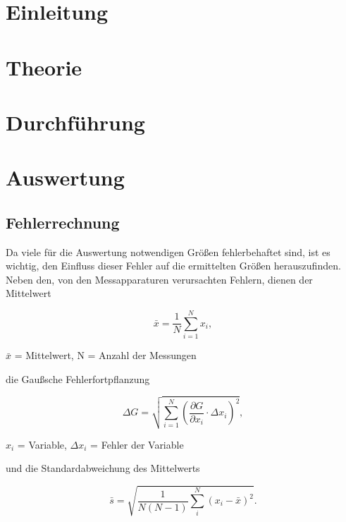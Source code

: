 
\section{Einleitung}				%

\section{Theorie}

\section{Durchführung}

\section{Auswertung}
\subsection{Fehlerrechnung}
Da viele für die Auswertung notwendigen Größen fehlerbehaftet sind, ist es wichtig, den Einfluss dieser Fehler auf die ermittelten
Größen herauszufinden. Neben den, von den Messapparaturen verursachten Fehlern, dienen der Mittelwert
\begin{formel}
\begin{equation}
 \bar{x} = \frac1N \sum_{i=1}^{N} x_i,
 \label{eq_mittel}
\end{equation}
\caption*{\small{$\bar{x}$ = Mittelwert, N = Anzahl der Messungen}}
\end{formel}

die Gaußsche Fehlerfortpflanzung

\begin{formel}
\begin{equation}
\Delta G = \sqrt{\sum_{i=1}^{N}\left( \frac{\partial G}{\partial x_i}\cdot \Delta x_i\right)^2},
\label{gauss}
\end{equation}
\caption*{$x_i$ = Variable, $\Delta x_i$ = Fehler der Variable}
\end{formel}
und die Standardabweichung des Mittelwerts

\begin{equation}
 \bar s = \sqrt{\frac{1}{N(N-1)} \sum_{i}^{N} (x_i - \bar{x})^2}.
 \label{eq_standard}
\end{equation}

